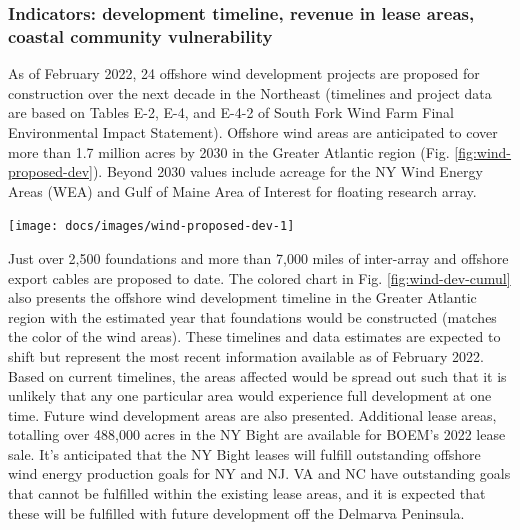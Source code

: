 \documentclass[
  10pt,
]{article}
\let\origfigure\figure
\let\endorigfigure\endfigure
\renewenvironment{figure}[1][2] {
    \expandafter\origfigure\expandafter[H]
} {
    \endorigfigure
}
\begin{document}
\hypertarget{indicators-development-timeline-revenue-in-lease-areas-coastal-community-vulnerability}{%
\subsubsection{Indicators: development timeline, revenue in lease areas,
coastal community
vulnerability}\label{indicators-development-timeline-revenue-in-lease-areas-coastal-community-vulnerability}}

As of February 2022, 24 offshore wind development projects are proposed
for construction over the next decade in the Northeast (timelines and
project data are based on Tables E-2, E-4, and E-4-2 of South Fork Wind
Farm Final Environmental Impact Statement). Offshore wind areas are
anticipated to cover more than 1.7 million acres by 2030 in the Greater
Atlantic region (Fig. \ref{fig:wind-proposed-dev}). Beyond 2030 values
include acreage for the NY Wind Energy Areas (WEA) and Gulf of Maine
Area of Interest for floating research array.

\begin{figure}

{\centering \texttt{[image: docs/images/wind-proposed-dev-1]} 

}

\caption{Proposed wind development on the northeast shelf.}\label{fig:wind-proposed-dev}
\end{figure}

Just over 2,500 foundations and more than 7,000 miles of inter-array and
offshore export cables are proposed to date. The colored chart in Fig.
\ref{fig:wind-dev-cumul} also presents the offshore wind development
timeline in the Greater Atlantic region with the estimated year that
foundations would be constructed (matches the color of the wind areas).
These timelines and data estimates are expected to shift but represent
the most recent information available as of February 2022. Based on
current timelines, the areas affected would be spread out such that it
is unlikely that any one particular area would experience full
development at one time. Future wind development areas are also
presented. Additional lease areas, totalling over 488,000 acres in the
NY Bight are available for BOEM's 2022 lease sale. It's anticipated that
the NY Bight leases will fulfill outstanding offshore wind energy
production goals for NY and NJ. VA and NC have outstanding goals that
cannot be fulfilled within the existing lease areas, and it is expected
that these will be fulfilled with future development off the Delmarva
Peninsula.
\end{document}
